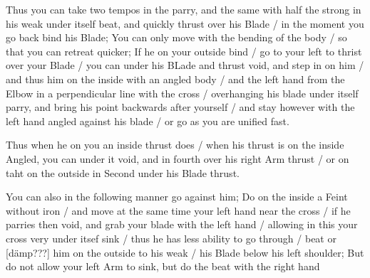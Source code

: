 
Thus you can take two tempos in the parry, and the same with half the
strong in his weak under itself beat, and quickly thrust over his
Blade / in the moment you go back bind his Blade; You can only move with
the bending of the body / so that you can retreat quicker; If he on
your outside bind / go to your left to thrist over your Blade / you
can under his BLade and thrust void, and step in on him / and thus him
on the inside with an angled body / and the left hand from the Elbow
in a perpendicular line with the cross / overhanging his blade under
itself parry, and bring his point backwards after yourself / and stay
however with the left hand angled against his blade / or go as you are
unified fast.


Thus when he on you an inside thrust does / when his thrust is on the
inside Angled, you can under it void, and in fourth over his right Arm
thrust / or on taht on the outside in Second under his Blade thrust.


You can also in the following manner go against him; Do on the inside
a Feint without iron / and move at the same time your left hand near
the cross / if he parries then void, and grab your blade with the left
hand / allowing in this your cross very under itsef sink / thus he has
less ability to go through / beat or [dämp???] him on the outside to his weak / his Blade
below his left shoulder; But do not allow your left Arm to sink, but
do the beat with the right hand